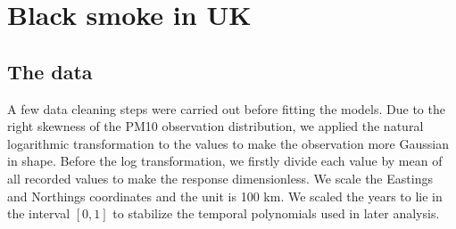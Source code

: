 \section{Black smoke in UK}

\subsection{The data}
A few data cleaning steps were carried out before fitting the models. Due to the right skewness of 
the PM10 observation distribution, we applied the natural logarithmic transformation to the values
to make the observation more Gaussian in shape. Before the log transformation, we firstly divide
each value by mean of all recorded values to make the response dimensionless.
We scale the Eastings and Northings coordinates and the unit is 100 km. We scaled the years to
lie in the interval $[0, 1]$ to stabilize the temporal polynomials used in later analysis.


